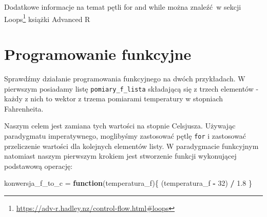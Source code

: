 \documentclass[paper=6in:9in,pagesize=pdftex,headinclude=on,footinclude=on,10pt]{scrbook}
\newenvironment{Shaded}{\begin{snugshade}}{\end{snugshade}}
\newcommand{\CommentTok}[1]{\textcolor[rgb]{0.56,0.35,0.01}{\textit{#1}}}
\newcommand{\ControlFlowTok}[1]{\textcolor[rgb]{0.13,0.29,0.53}{\textbf{#1}}}
\newcommand{\DataTypeTok}[1]{\textcolor[rgb]{0.13,0.29,0.53}{#1}}
\newcommand{\DecValTok}[1]{\textcolor[rgb]{0.00,0.00,0.81}{#1}}
\newcommand{\FloatTok}[1]{\textcolor[rgb]{0.00,0.00,0.81}{#1}}
\newcommand{\KeywordTok}[1]{\textcolor[rgb]{0.13,0.29,0.53}{\textbf{#1}}}
\newcommand{\NormalTok}[1]{#1}
\newcommand{\OperatorTok}[1]{\textcolor[rgb]{0.81,0.36,0.00}{\textbf{#1}}}
\newcommand{\StringTok}[1]{\textcolor[rgb]{0.31,0.60,0.02}{#1}}
\DeclareRobustCommand{\href}[2]{#2\footnote{\url{#1}}}
\begin{document}
Dodatkowe informacje na temat pętli for and while można znaleźć~w sekcji \href{https://adv-r.hadley.nz/control-flow.html\#loops}{Loops} książki Advanced R \citep{wickham2014advanced}

\hypertarget{prog-fun}{%
\section{Programowanie funkcyjne}\label{prog-fun}}

Sprawdźmy działanie programowania funkcyjnego na dwóch przykładach.
W pierwszym posiadamy listę \texttt{pomiary\_f\_lista} składającą się z trzech elementów - każdy z nich to wektor z trzema pomiarami temperatury w stopniach Fahrenheita.

\begin{Shaded}
\end{Shaded}

Naszym celem jest zamiana tych wartości na stopnie Celsjusza.
Używając paradygmatu imperatywnego, moglibyśmy zastosować pętlę \texttt{for} i zastosować przeliczenie wartości dla kolejnych elementów listy.
W paradygmacie funkcyjnym natomiast naszym pierwszym krokiem jest stworzenie funkcji wykonującej podstawową operację:

\begin{Shaded}
\begin{Highlighting}[]
\NormalTok{konwersja_f_to_c =}\StringTok{ }\ControlFlowTok{function}\NormalTok{(temperatura_f)\{}
\NormalTok{    (temperatura_f }\OperatorTok{-}\StringTok{ }\DecValTok{32}\NormalTok{) }\OperatorTok{/}\StringTok{ }\FloatTok{1.8}
\NormalTok{\}}
\end{Highlighting}
\end{Shaded}
\end{document}
